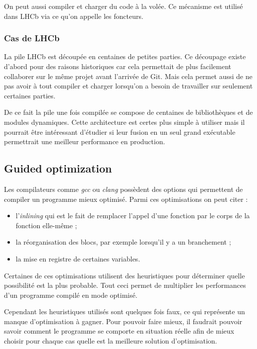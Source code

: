 \documentclass[a4paper]{report}
\begin{document}
On peut aussi compiler et charger du code à la volée.
Ce mécanisme est utilisé dans LHCb via ce qu'on appelle les foncteurs.

\subsubsection{Cas de LHCb}
La pile LHCb est découpée en centaines de petites parties.
Ce découpage existe d'abord pour des raisons historiques car cela permettait de plus facilement collaborer sur le même projet avant l'arrivée de Git.
Mais cela permet aussi de ne pas avoir à tout compiler et charger lorsqu'on a besoin de travailler sur seulement certaines parties.

De ce fait la pile une fois compilée se compose de centaines de bibliothèques et de modules dynamiques.
Cette architecture est certes plus simple à utiliser mais il pourrait être intéressant d'étudier si leur fusion en un seul grand exécutable permettrait une meilleur performance en production.

\subsection{Guided optimization}
Les compilateurs comme \emph{gcc} ou \emph{clang} possèdent des options qui permettent de compiler un programme mieux optimisé.
Parmi ces optimisations on peut citer :
\begin{itemize}
    \item l'\emph{inlining} qui est le fait de remplacer l'appel d'une fonction par le corps de la fonction elle-même ;
    \item la réorganisation des blocs, par exemple lorsqu'il y a un branchement ;
    \item la mise en registre de certaines variables.
\end{itemize}
Certaines de ces optimisations utilisent des heuristiques pour déterminer quelle possibilité est la plus probable.
Tout ceci permet de multiplier les performances d'un programme compilé en mode optimisé.

Cependant les heuristiques utilisés sont quelques fois faux, ce qui représente un manque d'optimisation à gagner.
Pour pouvoir faire mieux, il faudrait pouvoir savoir comment le programme se comporte en situation réelle afin de mieux choisir pour chaque cas quelle est la meilleure solution d'optimisation.
\end{document}
